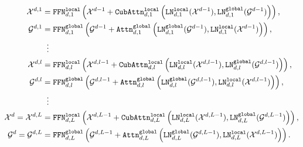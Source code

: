 \documentclass{article}
\begin{document}
 \begin{align}
    \centering
    \begin{aligned}
\mathcal{X}^{d,1} &= \mathtt{FFN}_{d,1}^{\mathtt{local}}\left(\mathcal{X}^{d-1}+\mathtt{CubAttn}_{d,1}^{\mathtt{local}}\left(\mathtt{LN}_{d,1}^{\mathtt{local}}(\mathcal{X}^{d-1}),\mathtt{LN}_{d,1}^{\mathtt{global}}(\mathcal{G}^{d-1})\right)\right), \\
\mathcal{G}^{d,1} &= \mathtt{FFN}_{d,1}^{\mathtt{global}}\left(\mathcal{G}^{d-1}+\mathtt{Attn}_{d,1}^{\mathtt{global}}\left(\mathtt{LN}_{d,1}^{\mathtt{global}}(\mathcal{G}^{d-1}), \mathtt{LN}_{d,1}^{\mathtt{local}}(\mathcal{X}^{d-1})\right)\right), \\
        &\;\;\vdots \\
        \mathcal{X}^{d,l} &= \mathtt{FFN}_{d,l}^{\mathtt{local}}\left(\mathcal{X}^{d,l-1}+\mathtt{CubAttn}_{d,l}^{\mathtt{local}}\left(\mathtt{LN}_{d,l}^{\mathtt{local}}(\mathcal{X}^{d,l-1}), \mathtt{LN}_{d,l}^{\mathtt{global}}(\mathcal{G}^{d,l-1})\right)\right), \\
\mathcal{G}^{d,l} &= \mathtt{FFN}_{d,l}^{\mathtt{global}}\left(\mathcal{G}^{d,l-1}+\mathtt{Attn}_{d,l}^{\mathtt{global}}\left(\mathtt{LN}_{d,l}^{\mathtt{global}}(\mathcal{G}^{d,l-1}), \mathtt{LN}_{d,l}^{\mathtt{local}}(\mathcal{X}^{d,l-1})\right)\right), \\
        &\;\;\vdots \\
        \mathcal{X}^{d}=\mathcal{X}^{d,L} &= \mathtt{FFN}_{d,L}^{\mathtt{local}}\left(\mathcal{X}^{d,L-1}+\mathtt{CubAttn}_{d,L}^{\mathtt{local}}\left(\mathtt{LN}_{d,L}^{\mathtt{local}}(\mathcal{X}^{d,L-1}),\mathtt{LN}_{d,L}^{\mathtt{global}}(\mathcal{G}^{d,L-1})\right)\right), \\
\mathcal{G}^{d}=\mathcal{G}^{d,L} &= \mathtt{FFN}_{d,L}^{\mathtt{global}}\left(\mathcal{G}^{d,L-1}+\mathtt{Attn}_{d,L}^{\mathtt{global}}\left(\mathtt{LN}_{d,L}^{\mathtt{global}}(\mathcal{G}^{d,L-1}), \mathtt{LN}_{d,L}^{\mathtt{local}}(\mathcal{X}^{d,L-1})\right)\right). \\
\end{aligned}
    \label{eq:cuboid_attention_block_compute}
 \end{align}
 
\end{document}
